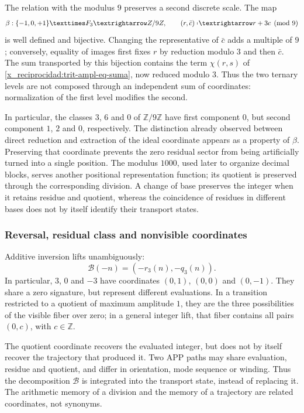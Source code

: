 The relation with the modulus \(9\) preserves a second discrete scale.
The map
\[
 \beta:\TRIT\times\mathbb F_3\longrightarrow\mathbb Z/9\mathbb Z,
 \qquad (r,\bar c)\longmapsto r+3c\pmod9
\]
is well defined and bijective. Changing the representative of \(\bar c\)
adds a multiple of \(9\); conversely, equality of images first fixes
\(r\) by reduction modulo \(3\) and then \(\bar c\). The sum
transported by this bijection contains the term
\(\chi(r,s)\) of \eqref{x_reciprocidad:trit-ampl-eq-suma}, now reduced modulo \(3\).
Thus the two ternary levels are not composed through an independent
sum of coordinates: normalization of the first level modifies
the second.

In particular, the classes \(3\), \(6\) and \(0\) of
\(\mathbb Z/9\mathbb Z\) have first component \(0\), but second
component \(1\), \(2\) and \(0\), respectively. The distinction already observed
between direct reduction and extraction of the ideal coordinate appears
as a property of \(\beta\). Preserving that coordinate prevents the
zero residual sector from being artificially turned into a single position.
The modulus \(1000\), used later to organize decimal blocks,
serves another positional representation function; its quotient is preserved
through the corresponding division. A change of base preserves the integer
when it retains residue and quotient, whereas the coincidence of residues
in different bases does not by itself identify their transport states.

\subsubsection{Reversal, residual class and nonvisible coordinates}
\label{x_reciprocidad:trit-ampl-inversion}

Additive inversion lifts unambiguously:
\[
 \mathcal B(-n)=(-r_3(n),-q_3(n)).
\]
In particular, \(3\), \(0\) and \(-3\) have coordinates
\((0,1)\), \((0,0)\) and \((0,-1)\). They share a zero signature, but represent
different evaluations. In a transition restricted to a quotient of
maximum amplitude \(1\), they are the three possibilities of the visible fiber over
zero; in a general integer lift, that fiber contains all pairs
\((0,c)\), with \(c\in\mathbb Z\).

The quotient coordinate recovers the evaluated integer, but does not by
itself recover the trajectory that produced it. Two APP paths may share
evaluation, residue and quotient, and differ in orientation, mode sequence or
winding. Thus the decomposition \(\mathcal B\) is integrated into the
transport state, instead of replacing it. The arithmetic memory of a
division and the memory of a trajectory are related coordinates, not
synonyms.

